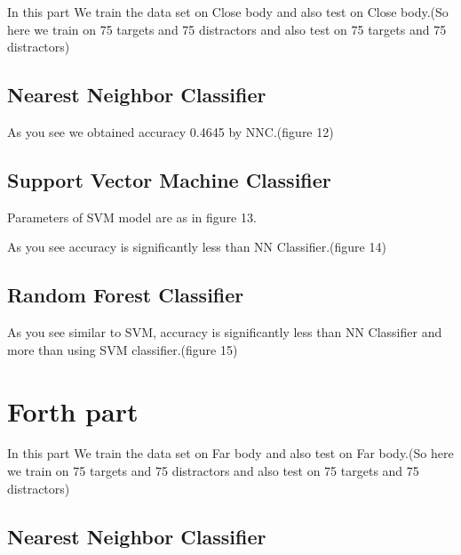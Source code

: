 \documentclass[9pt,twocolumn]{paper-template}
\begin{document}
In this part We train the data set on Close body and also test on Close body.(So here we train on 75 targets and 75 distractors and also test on 75 targets and 75 distractors)




\subsection*{Nearest Neighbor Classifier}





As you see we obtained accuracy 0.4645 by NNC.(figure 12)

\subsection*{Support Vector Machine Classifier}
Parameters of SVM model are as in figure 13.





As you see accuracy is significantly less than NN Classifier.(figure 14)

\subsection*{Random Forest Classifier}



As you see similar to SVM, accuracy is significantly less than NN Classifier and more than using SVM
classifier.(figure 15)








\section*{Forth part}





In this part We train the data set on Far body and also test on Far body.(So here we train on 75 targets and 75 distractors and also test on 75 targets and 75 distractors)




\subsection*{Nearest Neighbor Classifier}
\end{document}

